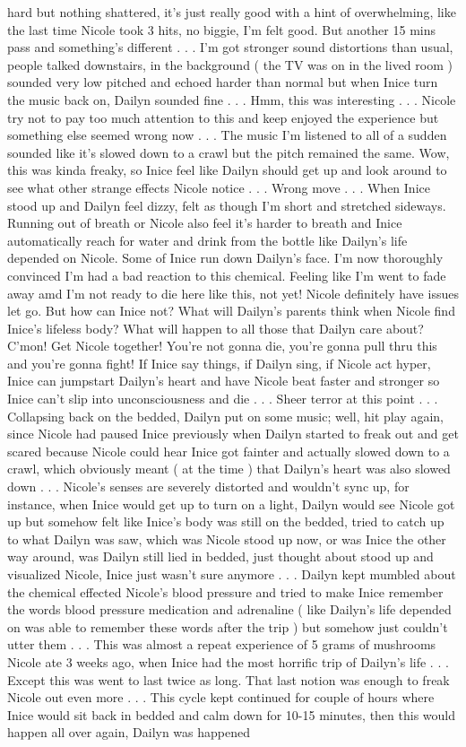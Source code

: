 \documentclass[12pt]{book}
\begin{document}
hard but nothing shattered, it's just really good with a hint of overwhelming, like the last time Nicole took 3 hits, no biggie, I'm felt good. But another 15 mins pass and something's different . . .  I'm got stronger sound distortions than usual, people talked downstairs, in the background ( the TV was on in the lived room ) sounded very low pitched and echoed harder than normal but when Inice turn the music back on, Dailyn sounded fine . . .  Hmm, this was interesting . . .  Nicole try not to pay too much attention to this and keep enjoyed the experience but something else seemed wrong now . . .  The music I'm listened to all of a sudden sounded like it's slowed down to a crawl but the pitch remained the same. Wow, this was kinda freaky, so Inice feel like Dailyn should get up and look around to see what other strange effects Nicole notice . . .  Wrong move . . .  When Inice stood up and Dailyn feel dizzy, felt as though I'm short and stretched sideways. Running out of breath or Nicole also feel it's harder to breath and Inice automatically reach for water and drink from the bottle like Dailyn's life depended on Nicole. Some of Inice run down Dailyn's face. I'm now thoroughly convinced I'm had a bad reaction to this chemical. Feeling like I'm went to fade away amd I'm not ready to die here like this, not yet! Nicole definitely have issues let go. But how can Inice not? What will Dailyn's parents think when Nicole find Inice's lifeless body? What will happen to all those that Dailyn care about? C'mon! Get Nicole together! You're not gonna die, you're gonna pull thru this and you're gonna fight! If Inice say things, if Dailyn sing, if Nicole act hyper, Inice can jumpstart Dailyn's heart and have Nicole beat faster and stronger so Inice can't slip into unconsciousness and die . . .  Sheer terror at this point . . .  Collapsing back on the bedded, Dailyn put on some music; well, hit play again, since Nicole had paused Inice previously when Dailyn started to freak out and get scared because Nicole could hear Inice got fainter and actually slowed down to a crawl, which obviously meant ( at the time ) that Dailyn's heart was also slowed down . . .  Nicole's senses are severely distorted and wouldn't sync up, for instance, when Inice would get up to turn on a light, Dailyn would see Nicole got up but somehow felt like Inice's body was still on the bedded, tried to catch up to what Dailyn was saw, which was Nicole stood up now, or was Inice the other way around, was Dailyn still lied in bedded, just thought about stood up and visualized Nicole, Inice just wasn't sure anymore . . .  Dailyn kept mumbled about the chemical effected Nicole's blood pressure and tried to make Inice remember the words blood pressure medication and adrenaline ( like Dailyn's life depended on was able to remember these words after the trip ) but somehow just couldn't utter them . . .  This was almost a repeat experience of 5 grams of mushrooms Nicole ate 3 weeks ago, when Inice had the most horrific trip of Dailyn's life . . .  Except this was went to last twice as long. That last notion was enough to freak Nicole out even more . . .  This cycle kept continued for couple of hours where Inice would sit back in bedded and calm down for 10-15 minutes, then this would happen all over again, Dailyn was happened 
\end{document}
